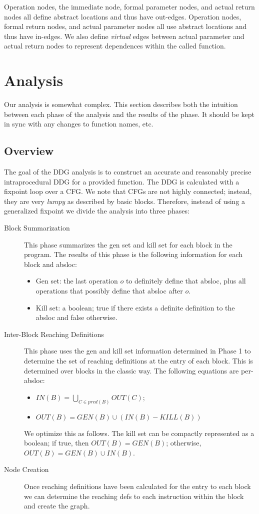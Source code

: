 \documentclass[11pt]{article}
\begin{document}
Operation nodes, the immediate node, formal parameter nodes, and
actual return nodes all define abstract locations and thus have
out-edges. Operation nodes, formal return nodes, and actual parameter
nodes all use abstract locations and thus have in-edges. We also
define \emph{virtual} edges between actual parameter and actual return
nodes to represent dependences within the called function. 

\section*{Analysis}

Our analysis is somewhat complex. This section describes both the
intuition between each phase of the analysis and the results of the
phase. It should be kept in sync with any changes to function names,
etc.

\subsection*{Overview}

The goal of the DDG analysis is to construct an accurate and
reasonably precise intraprocedural DDG for a provided function. The
DDG is calculated with a fixpoint loop over a CFG. We note that CFGs
are not highly connected; instead, they are very \emph{lumpy} as
described by basic blocks. Therefore, instead of using a generalized
fixpoint we divide the analysis into three phases:
\begin{description}
\item[Block Summarization] This phase summarizes the gen set and kill
  set for each block in the program. The results of this phase is the
  following information for each block and absloc:
\begin{itemize}
\item Gen set: the last operation $o$ to definitely define that absloc,
  plus all operations that possibly define that absloc after $o$. 
\item Kill set: a boolean; true if there exists a definite definition
  to the absloc and false otherwise.
\end{itemize}
\item[Inter-Block Reaching Definitions] This phase uses the gen and
  kill set information determined in Phase 1 to determine the set of
  reaching definitions at the entry of each block. This is determined
  over blocks in the classic way. The following equations are per-absloc:
  \begin{itemize}
    \item $IN(B) = \bigcup_{C \in pred(B)} OUT(C)$;
    \item $OUT(B) = GEN(B) \cup (IN(B) - KILL(B))$
  \end{itemize}
  We optimize this as follows. The kill set can be compactly
  represented as a boolean; if true, then $OUT(B) = GEN(B)$;
  otherwise, $OUT(B) = GEN(B) \cup IN(B)$. 
\item[Node Creation] Once reaching definitions have been calculated
  for the entry to each block we can determine the reaching defs to
  each instruction within the block and create the graph. 
\end{description}
\end{document}
